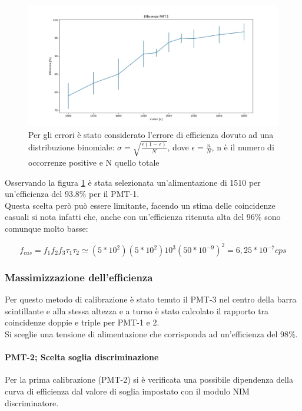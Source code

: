 \documentclass[a4paper]{article}
\begin{document}
\begin{figure}[H]
\centering
\includegraphics[scale=0.3]{./immagini/TimeOfFlight/EffPMT145mV}
\caption{Per gli errori è stato considerato l'errore di efficienza dovuto ad una distribuzione binomiale: $\sigma = \sqrt{\frac{\epsilon(1-\epsilon)}{N}}$, dove $\epsilon = \frac{n}{N}$, n è il numero di occorrenze positive e N quello totale}
\label{fig:EffPMT145mV}
\end{figure}

Osservando la figura \ref{fig:EffPMT145mV} è stata selezionata un'alimentazione di 1510 per un'efficienza del 93.8$\%$ per il PMT-1.\\
Questa scelta però può essere limitante, facendo un stima delle coincidenze casuali si nota infatti che, anche con un'efficienza ritenuta alta del 96$\%$ sono comunque molto basse:

\begin{equation}
f_{cas} = f_1 f_2 f_3 \tau _1\tau _2 \simeq (5*10^2)(5*10^2) 10^3 (50*10^{-9})^2 = 6,25*10^{-7} cps
\label{eq:CoinCasPMT1Prova1}
\end{equation}

\subsubsection{Massimizzazione dell'efficienza}
Per questo metodo di calibrazione è stato tenuto il PMT-3 nel centro della barra scintillante e alla stessa altezza e a turno è stato calcolato il rapporto tra coincidenze doppie e triple per PMT-1 e 2.\\
Si sceglie una tensione di alimentazione che corrisponda ad un'efficienza del 98$\%$.

\paragraph{PMT-2; Scelta soglia discriminazione}
Per la prima calibrazione (PMT-2) si è verificata una possibile dipendenza della curva di efficienza dal valore di soglia impostato con il modulo NIM discriminatore.
\end{document}
